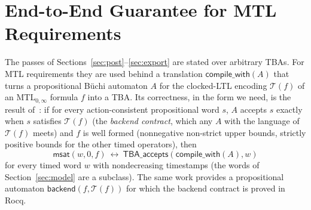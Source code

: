 \documentclass[preprint,12pt]{elsarticle}
\providecommand{\T}{\mathcal{T}}
\begin{document}
\section{End-to-End Guarantee for MTL Requirements}
\label{sec:composition}
The passes of Sections~\ref{sec:post}--\ref{sec:export} are stated over arbitrary TBAs. For MTL requirements they are used behind a translation $\mathsf{compile\_with}(A)$ that turns a propositional B\"uchi automaton $A$ for the clocked-LTL encoding $\T(f)$ of an MTL$_{0,\infty}$ formula $f$ into a TBA. Its correctness, in the form we need, is the result of~\cite{faresmtl}: if for every action-consistent propositional word $s$, $A$ accepts $s$ exactly when $s$ satisfies $\T(f)$ (the \emph{backend contract}, which any $A$ with the language of $\T(f)$ meets) and $f$ is well formed (nonnegative non-strict upper bounds, strictly positive bounds for the other timed operators), then
\[
\mathsf{msat}(w,0,f)\ \leftrightarrow\ \mathsf{TBA\_accepts}(\mathsf{compile\_with}(A),w)
\]
for every timed word $w$ with nondecreasing timestamps (the words of Section~\ref{sec:model} are a subclass). The same work provides a propositional automaton $\mathsf{backend}(f,\T(f))$ for which the backend contract is proved in Rocq.
\end{document}
